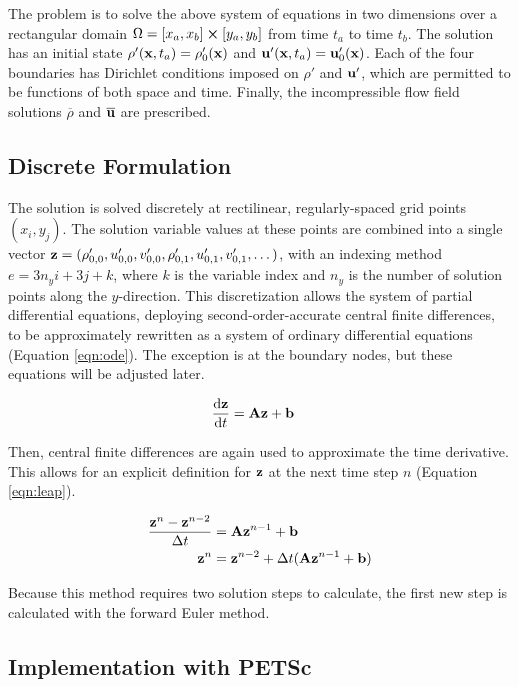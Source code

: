 \documentclass{article}
\begin{document}
The problem is to solve the above system of equations in two dimensions over a rectangular domain $\Omega = [x_{a}, x_{b}] \cross [y_{a}, y_{b}]$ from time $t_{a}$ to time $t_{b}$. The solution has an initial state $\rho'(\vb{x}, t_{a}) = \rho'_{0}(\vb{x})$ and $\vb{u}'(\vb{x}, t_{a}) = \vb{u}'_{0}(\vb{x})$. Each of the four boundaries has Dirichlet conditions imposed on $\rho'$ and $\vb{u}'$, which are permitted to be functions of both space and time. Finally, the incompressible flow field solutions $\overline{\rho}$ and $\overline{\vb{u}}$ are prescribed.

\subsection{Discrete Formulation}

The solution is solved discretely at rectilinear, regularly-spaced grid points $(x_{i}, y_{j})$. The solution variable values at these points are combined into a single vector $\vb{z} = (\rho'_{0, 0}, u'_{0, 0}, v'_{0, 0}, \rho'_{0, 1}, u'_{0, 1}, v'_{0, 1}, \dots)$, with an indexing method $e = 3 n_{y} i + 3j + k$, where $k$ is the variable index and $n_{y}$ is the number of solution points along the $y$-direction. This discretization allows the system of partial differential equations, deploying second-order-accurate central finite differences, to be approximately rewritten as a system of ordinary differential equations (Equation \ref{eqn:ode}). The exception is at the boundary nodes, but these equations will be adjusted later.

\begin{align}
	\dv{\vb{z}}{t} &= \vb{A} \vb{z} + \vb{b} \label{eqn:ode}
\end{align}

Then, central finite differences are again used to approximate the time derivative. This allows for an explicit definition for $\vb{z}$ at the next time step $n$ (Equation \ref{eqn:leap}).

\begin{align}
	\frac{\vb{z}^{n} - \vb{z}^{n - 2}}{\Delta t} &= \vb{A} \vb{z}^{n - 1} + \vb{b} \\
	\vb{z}^{n} &= \vb{z}^{n - 2} + \Delta t (\vb{A} \vb{z}^{n - 1} + \vb{b}) \label{eqn:leap}
\end{align}

Because this method requires two solution steps to calculate, the first new step is calculated with the forward Euler method.

\subsection{Implementation with PETSc}
\end{document}
